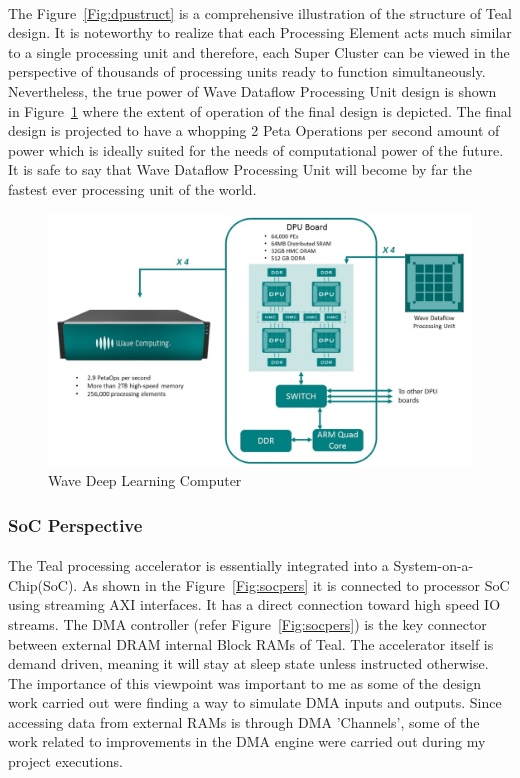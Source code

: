 \paragraph{}
The Figure~\ref{Fig:dpustruct} is a comprehensive illustration of the structure of Teal design. It is noteworthy to realize that each Processing Element acts much similar to a single processing unit and therefore, each Super Cluster can be viewed in the perspective of thousands of processing units ready to function simultaneously. Nevertheless, the true power of Wave Dataflow Processing Unit design is shown in Figure~\ref{Fig:dpuboard} where the extent of operation of the final design is depicted. The final design is projected to have a whopping 2 Peta Operations per second amount of power which is ideally suited for the needs of computational power of the future. It is safe to say that Wave Dataflow Processing Unit will become by far the fastest ever processing unit of the world.

\begin{figure}[h]
    \centering
    \includegraphics[trim=0cm 0cm 0cm 0cm, clip=true,scale=0.45]{figures/dpu_board.jpg}
    \caption{Wave Deep Learning Computer\label{Fig:dpuboard}}\vspace{-4mm}
    \end{figure}

\subsubsection{SoC Perspective}
\label{sec:socper}
\paragraph{}
The Teal processing accelerator is essentially integrated into a System-on-a-Chip(SoC). As shown in the Figure~\ref{Fig:socpers} it is connected to processor SoC using streaming AXI interfaces. It has a direct connection toward high speed IO streams. The DMA controller (refer Figure~\ref{Fig:socpers}) is the key connector between external DRAM internal Block RAMs of Teal. The accelerator itself is demand driven, meaning it will stay at sleep state unless instructed otherwise. The importance of this viewpoint was important to me as some of the design work carried out were finding a way to simulate DMA inputs and outputs. Since accessing data from external RAMs is through DMA ’Channels’, some of the work related to improvements in the DMA engine were carried out during my project executions. 

